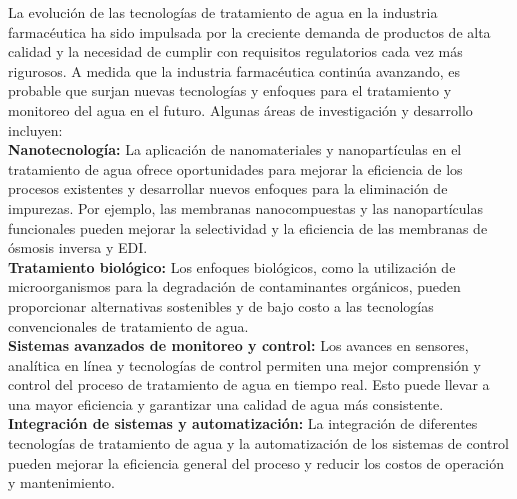 La evolución de las tecnologías de tratamiento de agua en la industria farmacéutica ha sido impulsada por la creciente
demanda de productos de alta calidad y la necesidad de cumplir con requisitos regulatorios cada vez más rigurosos. A
medida que la industria farmacéutica continúa avanzando, es probable que surjan nuevas tecnologías y enfoques para el
tratamiento y monitoreo del agua en el futuro. Algunas áreas de investigación y desarrollo incluyen:\\

\textbf{Nanotecnología:} La aplicación de nanomateriales y nanopartículas en el tratamiento de agua ofrece oportunidades para
mejorar la eficiencia de los procesos existentes y desarrollar nuevos enfoques para la eliminación de impurezas. Por ejemplo,
las membranas nanocompuestas y las nanopartículas funcionales pueden mejorar la selectividad y la eficiencia de las membranas de ósmosis inversa y EDI.\\

\textbf{Tratamiento biológico:} Los enfoques biológicos, como la utilización de microorganismos para la degradación de contaminantes
orgánicos, pueden proporcionar alternativas sostenibles y de bajo costo a las tecnologías convencionales de tratamiento de agua.\\

\textbf{Sistemas avanzados de monitoreo y control:} Los avances en sensores, analítica en línea y tecnologías de control permiten
una mejor comprensión y control del proceso de tratamiento de agua en tiempo real. Esto puede llevar a una mayor eficiencia y
garantizar una calidad de agua más consistente.\\

\textbf{Integración de sistemas y automatización:} La integración de diferentes tecnologías de tratamiento de agua y la
automatización de los sistemas de control pueden mejorar la eficiencia general del proceso y reducir los costos de
operación y mantenimiento.\\


